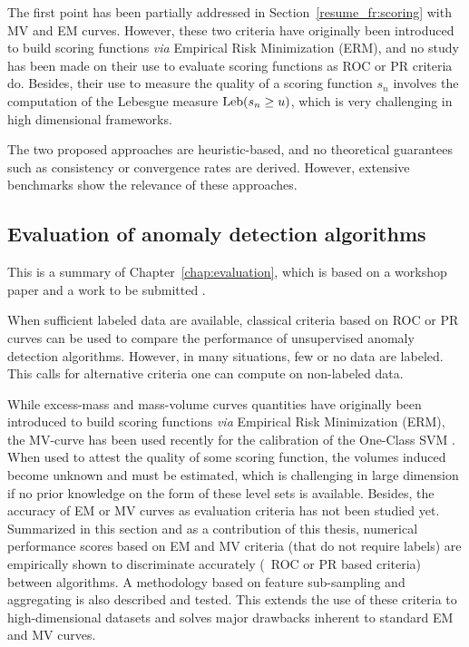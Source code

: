 The first point has been partially addressed in Section~\ref{resume_fr:scoring} with MV and EM curves.
However, these two criteria have originally been introduced to build scoring functions \emph{via} Empirical Risk Minimization (ERM), and no study has been made on their use to evaluate scoring functions as ROC or PR criteria do.
Besides, their use to measure the quality of a scoring function $s_n$ involves the computation of the Lebesgue measure  $\text{Leb}(s_n \ge u)$, which is very challenging in high dimensional frameworks. 

The two proposed approaches are heuristic-based, and no theoretical guarantees such as consistency or convergence rates are derived. However, extensive benchmarks show the relevance of these approaches.

\subsection{Evaluation of anomaly detection algorithms}
\label{resume_fr:evaluation}
This is a summary of Chapter~\ref{chap:evaluation}, which is based on a workshop paper \citep{ICMLworkshop16} and a work to be submitted \citep{NIPS16evaluation}.


When sufficient labeled data are available, classical criteria based on ROC \citep{Provost1997, Provost1998, Fawcett2006} or PR \citep{Davis2006, Clemencon2009} curves can be used to compare the performance of unsupervised anomaly detection algorithms. However, in many situations, few or no data are labeled. This calls for alternative criteria one can compute on non-labeled data.

While excess-mass and mass-volume curves quantities have originally been introduced to build scoring functions \emph{via}
Empirical Risk Minimization (ERM), the MV-curve has been used recently for the calibration of the One-Class SVM \citep{Thomas2015}.
When used to attest the quality of some scoring function, the volumes induced become unknown and must be estimated, which is challenging in large dimension if no prior knowledge on the form of these level sets is available.
%
Besides, the accuracy of EM or MV curves as evaluation criteria has not been studied yet.
%
Summarized in this section and as a contribution of this thesis, numerical performance scores based on EM and MV criteria (that do not require labels) are empirically shown to discriminate accurately (\wrt~ROC or PR based criteria) between algorithms.
A methodology based on feature sub-sampling and aggregating is also described and tested. This extends the use of these criteria to high-dimensional datasets and solves major drawbacks inherent to standard EM and MV curves.

